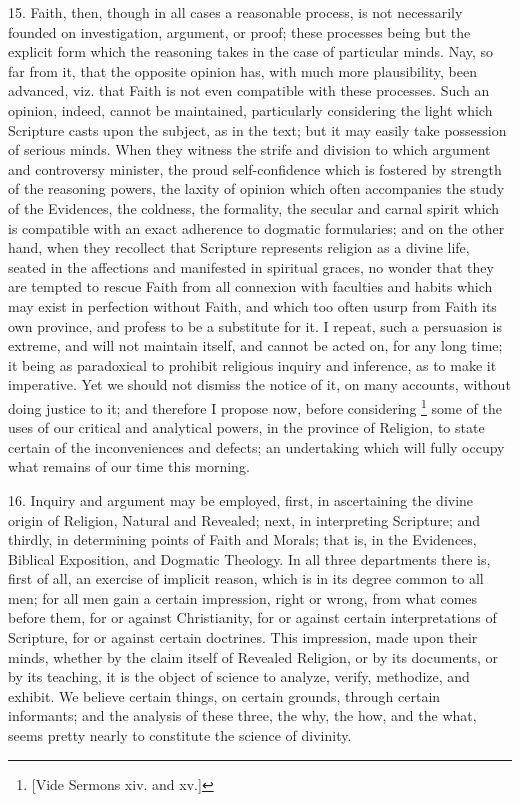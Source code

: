 15. Faith, then, though in all cases a reasonable process, is not
necessarily founded on investigation, argument, or proof; these
processes being but the explicit form which the reasoning takes in the
case of particular minds. Nay, so far from it, that the opposite
opinion has, with much more plausibility, been advanced, viz. that
Faith is not even compatible with these processes. Such an opinion,
indeed, cannot be maintained, particularly considering the light which
Scripture casts upon the subject, as in the text; but it may easily
take possession of serious minds. When they witness the strife and
division to which argument and controversy minister, the proud
self-confidence which is fostered by strength of the reasoning powers,
the laxity of opinion which often accompanies the study of the
Evidences, the coldness, the formality, the secular and carnal spirit
which is compatible with an exact adherence to dogmatic formularies;
and on the other hand, when they recollect that Scripture represents
religion as a divine life, seated in the affections and manifested in
spiritual graces, no wonder that they are tempted to rescue Faith from
all connexion with faculties and habits which may exist in perfection
without Faith, and which too often usurp from Faith its own province,
and profess to be a substitute for it. I repeat, such a persuasion is
extreme, and will not maintain itself, and cannot be acted on, for any
long time; it being as paradoxical to prohibit religious inquiry and
inference, as to make it imperative. Yet we should not dismiss the
notice of it, on many accounts, without doing justice to it; and
therefore I propose now, before considering \footnote{[Vide Sermons
xiv. and xv.]} some of the uses of our critical and analytical powers, in the
province of Religion, to state certain of the inconveniences and
defects; an undertaking which will fully occupy what remains of our
time this morning.

16. Inquiry and argument may be employed, first, in ascertaining
the divine origin of Religion, Natural and Revealed; next, in
interpreting Scripture; and thirdly, in determining points of Faith
and Morals; that is, in the Evidences, Biblical Exposition, and
Dogmatic Theology. In all three departments there is, first of all, an
exercise of implicit reason, which is in its degree common to all men;
for all men gain a certain impression, right or wrong, from what comes
before them, for or against Christianity, for or against certain
interpretations of Scripture, for or against certain doctrines. This
impression, made upon their minds, whether by the claim itself of
Revealed Religion, or by its documents, or by its teaching, it is the
object of science to analyze, verify, methodize, and exhibit. We
believe certain things, on certain grounds, through certain
informants; and the analysis of these three, the why, the how, and the
what, seems pretty nearly to constitute the science of divinity.

